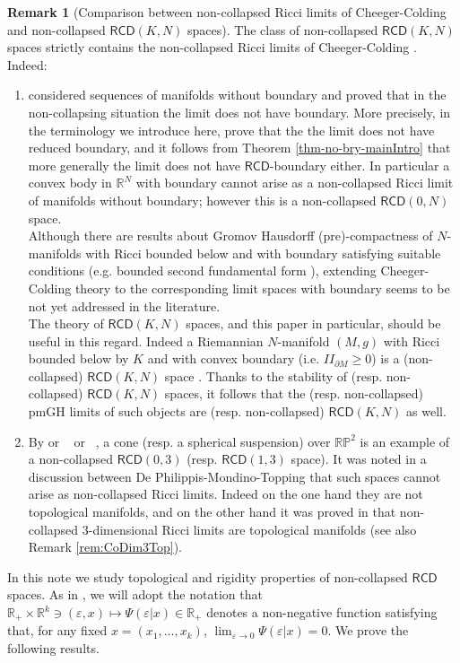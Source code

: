 \documentclass[a4paper]{amsart}
\theoremstyle{plain}
\theoremstyle{definition}
\newtheorem{remark}[lemma]{Remark}
\numberwithin{equation}{section}
\newcommand{\R}{\mathbb{R}}
\newcommand{\RCD}{\mathsf{RCD}}
\begin{document}
{ 
 {

 \begin{remark}[Comparison between non-collapsed Ricci limits of Cheeger-Colding \cite{CC97} and non-collapsed $\RCD(K,N)$ spaces]
 The class of non-collapsed $\RCD(K,N)$ spaces strictly contains the non-collapsed Ricci limits of Cheeger-Colding \cite{CC97}. Indeed:
 \begin{enumerate}
 \item  \cite{CC97} considered sequences of manifolds without boundary and proved that in the non-collapsing situation the limit does not have boundary. More precisely, in the terminology we introduce here,  \cite{CC97}  prove that the the limit does not have reduced boundary, and it follows from  Theorem \ref{thm-no-bry-mainIntro} that more generally  the limit does not have $\RCD$-boundary either.
 In particular a convex body in $\R^{N}$ with boundary cannot arise as a non-collapsed Ricci limit of manifolds without boundary; however this is a non-collapsed $\RCD(0,N)$ space. 
 \\Although there are results about Gromov Hausdorff (pre)-compactness of $N$-manifolds  with Ricci bounded below and with boundary satisfying suitable conditions (e.g. bounded second fundamental form  \cite{Wong}), extending Cheeger-Colding theory to the corresponding limit spaces with boundary seems to be not yet addressed in the literature. 
 \\The theory of $\RCD(K,N)$ spaces, and this paper in particular, should be useful in this regard. Indeed a Riemannian $N$-manifold $(M,g)$  with Ricci bounded below by $K$ and with convex boundary (i.e. $II_{\partial M}\geq 0$) is a (non-collapsed) $\RCD(K,N)$ space  \cite[Theorem 2.4]{HanMeasRig}.
 Thanks to the stability of (resp. non-collapsed) $\RCD(K,N)$ spaces, it follows that the (resp. non-collapsed) pmGH limits of such objects are (resp. non-collapsed) $\RCD(K,N)$  as well.
  \item By  \cite{palvs} or ~\cite{Ket} { or ~\cite{GGKMS}}, a cone (resp. a spherical suspension) over $\mathbb{RP}^{2}$ is an example of a non-collapsed $\RCD(0,3)$ (resp. $\RCD(1,3)$ space). It was noted in a discussion between De Philippis-Mondino-Topping that such spaces cannot arise as non-collapsed Ricci limits. Indeed on the one hand they are not topological manifolds, and on the other hand it was proved in \cite{Sim, SimTop} that non-collapsed 3-dimensional Ricci limits  are topological manifolds (see also Remark \ref{rem:CoDim3Top}).
 \end{enumerate}
 \end{remark}
}



In this note we study topological and rigidity properties of non-collapsed $\RCD$ spaces.
As in \cite{CC97}, we will adopt the notation that $\R_{+}\times \R^k\ni (\varepsilon,x)\mapsto  \Psi(\varepsilon|x)\in \R_{+}$ denotes a non-negative function satisfying that, for any fixed $x=(x_1,\ldots,x_k)$, $\lim_{\varepsilon\to 0} \Psi(\varepsilon|x)=0$.
 We prove the following results.
}
\end{document}
